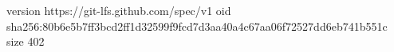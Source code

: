 version https://git-lfs.github.com/spec/v1
oid sha256:80b6e5b7ff3bcd2ff1d32599f9fcd7d3aa40a4c67aa06f72527dd6eb741b551c
size 402
